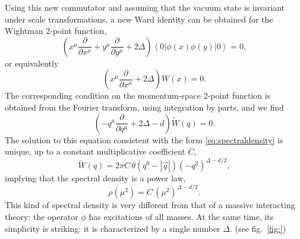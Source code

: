 \documentclass[a4paper,12pt]{article}
\newcommand{\ket}[1]{\left| #1 \right\rangle}
\newcommand{\bra}[1]{\left\langle #1 \right|}
\numberwithin{equation}{section}
\begin{document}
Using this new commutator and assuming that the vacuum state is invariant under scale transformations, a new Ward identity can be obtained for the Wightman 2-point function,
\begin{equation}
	\left( x^\mu \frac{\partial}{\partial x^\mu} 
	+ y^\mu \frac{\partial}{\partial y^\mu}  + 2\Delta \right)
	\bra{0} \phi(x) \phi(y) \ket{0} = 0,
\end{equation}
or equivalently
\begin{equation}
	\left( x^\mu \frac{\partial}{\partial x^\mu} + 2 \Delta \right) 
	W(x) = 0. 
\end{equation}
The corresponding condition on the momentum-space 2-point function
is obtained from the Fourier transform, using integration by parts, and we find
\begin{equation}
	\left( -q^\mu \frac{\partial}{\partial q^\mu} + 2 \Delta - d \right)
	\widetilde{W}(q) = 0. 
\end{equation}
The solution to this equation consistent with the form \eqref{eq:spectraldensity} is unique, up to a constant multiplicative coefficient $C$,
\begin{equation}
	\widetilde{W}(q)
	= 2\pi C \, \theta\left( q^0 - \left| \vec{q} \right| \right)
	(-q^2)^{\Delta - d/2},
\end{equation}
implying that the spectral density is a power law,
\begin{equation}
	\rho(\mu^2) = C \, (\mu^2)^{\Delta - d/2}.
\end{equation}
This kind of spectral density is very different from that of a massive interacting theory: the operator $\phi$ has excitations of all masses.
At the same time, its simplicity is striking: it is characterized by a single number $\Delta$.
(see fig.~\ref{fig:})
\end{document}
